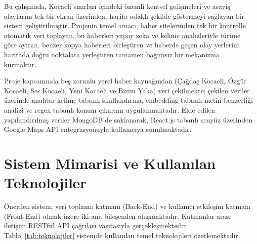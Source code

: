 \documentclass[conference]{IEEEtran}
\begin{document}
    Bu çalışmada, Kocaeli sınırları içindeki önemli kentsel gelişmeleri ve asayiş olaylarını tek bir ekran üzerinden, harita odaklı şekilde göstermeyi sağlayan bir sistem geliştirilmiştir. Projenin temel amacı; haber sitelerinden tek bir kontrolle otomatik veri toplayan, bu haberleri yapay zeka ve kelime analizleriyle türüne göre ayıran, benzer kopya haberleri birleştiren ve haberde geçen olay yerlerini haritada doğru noktalara yerleştiren tamamen bağımsız bir mekanizma kurmaktır.

    Proje kapsam{\i}nda be{\c s} zorunlu yerel haber kayna{\u g}{\i}ndan ({\c C}a{\u g}da{\c s} Kocaeli, {\"O}zg{\"u}r Kocaeli, Ses Kocaeli, Yeni Kocaeli ve Bizim Yaka) veri {\c c}ekilmekte; {\c c}ekilen veriler {\"u}zerinde anahtar kelime tabanl{\i} s{\i}n{\i}fland{\i}rma, embedding tabanl{\i} metin benzerli{\u g}i analizi ve regex tabanl{\i} konum {\c c}{\i}kar{\i}m{\i} uygulanmaktad{\i}r. Elde edilen yap{\i}land{\i}r{\i}lm{\i}{\c s} veriler MongoDB'de saklanarak, React.js tabanl{\i} aray{\"u}z {\"u}zerinden Google Maps API entegrasyonuyla kullan{\i}c{\i}ya sunulmaktad{\i}r.

    \section{Sistem Mimarisi ve Kullan{\i}lan Teknolojiler}

    {\"O}nerilen sistem, veri toplama katman{\i} (Back-End) ve kullan{\i}c{\i} etkile{\c s}im katman{\i} (Front-End) olmak {\"u}zere iki ana bile{\c s}enden olu{\c s}maktad{\i}r. Katmanlar aras{\i} ileti{\c s}im RESTful API {\c c}a{\u g}r{\i}lar{\i} vas{\i}tas{\i}yla ger{\c c}ekle{\c s}mektedir. Tablo~\ref{tab:teknolojiler} sistemde kullan{\i}lan temel teknolojileri {\"o}zetlemektedir.
\end{document}
